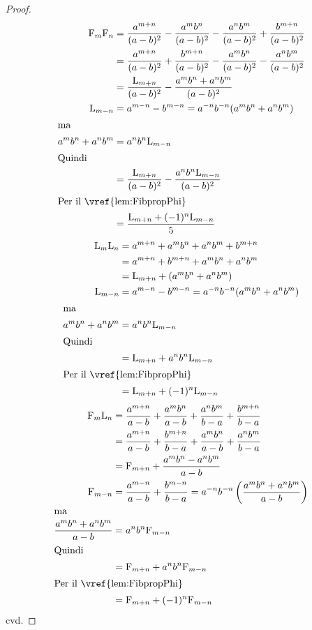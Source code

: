\begin{proof}
\begin{align*}
	\Fib{m}\Fib{n}={}&\dfrac{a^{m+n}}{(a-b)^2}-\dfrac{a^mb^n}{(a-b)^2}-\dfrac{a^nb^m}{(a-b)^2}+\dfrac{b^{m+n}}{(a-b)^2}\\
	={}&\dfrac{a^{m+n}}{(a-b)^2}+\dfrac{b^{m+n}}{(a-b)^2}-\dfrac{a^mb^n}{(a-b)^2}-\dfrac{a^nb^m}{(a-b)^2}\\
	={}&\dfrac{\Luc{m+n}}{(a-b)^2}-\dfrac{a^mb^n+a^nb^m}{(a-b)^2}\\
	\Luc{m-n}={}&a^{m-n}-b^{m-n}=a^{-n}b^{-n}(a^mb^n+a^nb^m)\\
	\intertext{ma}
	a^mb^n+a^nb^m={}&a^{n}b^{n}\Luc{m-n}\\
	\intertext{Quindi}
	={}&\dfrac{\Luc{m+n}}{(a-b)^2}-\dfrac{a^{n}b^{n}\Luc{m-n}}{(a-b)^2}\\
	\intertext{Per il~\vref{lem:FibpropPhi}}
	={}&\dfrac{\Luc{m+n}+(-1)^{n}\Luc{m-n}}{5}
\end{align*}
\begin{align*}
	\Luc{m}\Luc{n}={}&a^{m+n}+a^mb^n+a^nb^m+b^{m+n}\\
	={}&a^{m+n}+b^{m+n}+a^mb^n+a^nb^m\\
	={}&\Luc{m+n}+(a^mb^n+a^nb^m)\\
	\Luc{m-n}={}&a^{m-n}-b^{m-n}=a^{-n}b^{-n}(a^mb^n+a^nb^m)\\
	\intertext{ma}
	a^mb^n+a^nb^m={}&a^{n}b^{n}\Luc{m-n}\\
	\intertext{Quindi}
	={}&\Luc{m+n}+a^{n}b^{n}\Luc{m-n}\\
	\intertext{Per il~\vref{lem:FibpropPhi}}
	={}&\Luc{m+n}+(-1)^{n}\Luc{m-n}
\end{align*}
\begin{align*}
	\Fib{m}\Luc{n}={}&\dfrac{a^{m+n}}{a-b}+\dfrac{a^mb^n}{a-b}+\dfrac{a^nb^m}{b-a}+\dfrac{b^{m+n}}{b-a}\\
	={}&\dfrac{a^{m+n}}{a-b}+\dfrac{b^{m+n}}{b-a}+\dfrac{a^mb^n}{a-b}+\dfrac{a^nb^m}{b-a}\\
	={}&\Fib{m+n}+\dfrac{a^mb^n-a^nb^m}{a-b}\\
	\Fib{m-n}={}&\dfrac{a^{m-n}}{a-b}+\dfrac{b^{m-n}}{b-a}=a^{-n}b^{-n}\left(\dfrac{a^mb^n+a^nb^m}{a-b}\right)\\
	\intertext{ma}
	\dfrac{a^mb^n+a^nb^m}{a-b}={}&a^{n}b^{n}\Fib{m-n}\\
	\intertext{Quindi}
	={}&\Fib{m+n}+a^{n}b^{n}\Fib{m-n}\\
	\intertext{Per il~\vref{lem:FibpropPhi}}
	={}&\Fib{m+n}+(-1)^{n}\Fib{m-n}
\end{align*}
cvd.
\end{proof}
